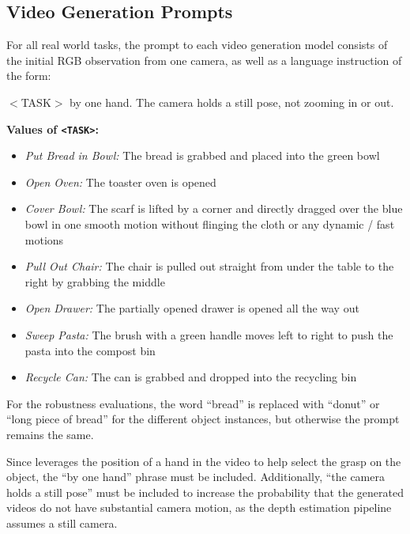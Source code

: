 \appendix
\subsection{Video Generation Prompts}
\label{sec:vid_gen_prompts}

 For all real world tasks, the prompt to each video generation model consists of the initial RGB observation from one camera, as well as a language instruction of the form:

\begin{promptbox}[title={Real World Task Language Prompt}]

$<$TASK$>$ by one hand. The camera holds a still pose, not zooming in or out.

\end{promptbox}

\textbf{Values of \texttt{<TASK>}:}
\begin{itemize}
    \item \textit{Put Bread in Bowl:} The bread is grabbed and placed into the green bowl
    \item \textit{Open Oven:} The toaster oven is opened
    \item \textit{Cover Bowl:} The scarf is lifted by a corner and directly dragged over the blue bowl in one smooth motion without flinging the cloth or any dynamic / fast motions
    \item \textit{Pull Out Chair:} The chair is pulled out straight from under the table to the right by grabbing the middle
    \item \textit{Open Drawer:} The partially opened drawer is opened all the way out
    \item \textit{Sweep Pasta:} The brush with a green handle moves left to right to push the pasta into the compost bin
    \item \textit{Recycle Can:} The can is grabbed and dropped into the recycling bin
\end{itemize}

For the robustness evaluations, the word ``bread'' is replaced with ``donut'' or ``long piece of bread'' for the different object instances, but otherwise the prompt remains the same.

Since \algo leverages the position of a hand in the video to help select the grasp on the object, the ``by one hand'' phrase must be included. Additionally, ``the camera holds a still pose'' must be included to increase the probability that the generated videos do not have substantial camera motion, as the depth estimation pipeline assumes a still camera. 

